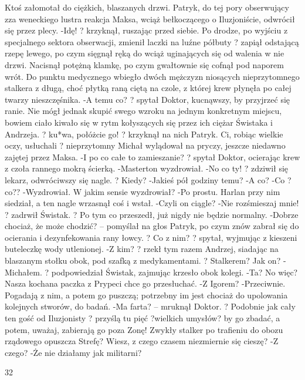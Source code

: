 \documentclass[../MAIN.tex]{subfiles}
\begin{document}
Ktoś załomotał do ciężkich, blaszanych drzwi. Patryk, do tej pory obserwujący zza weneckiego lustra reakcja Maksa, wciąż bełkoczącego o Iluzjoniście, odwrócił się przez plecy.
-Idę! ? krzyknął, ruszając przed siebie. Po drodze, po wyjściu z specjalnego sektora obserwacji, zmienił laczki na luźne półbuty ? zapiął odstającą rzepę lewego, po czym sięgnął ręką do wciąż uginających się od walenia w nie drzwi. Nacisnął potężną klamkę, po czym gwałtownie się cofnął pod naporem wrót.
Do punktu medycznego wbiegło dwóch mężczyzn niosących nieprzytomnego stalkera z długą, choć płytką raną ciętą na czole, z której krew płynęła po całej twarzy nieszczęśnika.
-A temu co? ? spytał Doktor, kucnąwszy, by przyjrzeć się ranie. Nie mógł jednak skupić swego wzroku na jednym konkretnym miejscu, bowiem ciało kiwało się w rytm kołyszących się przez ich ciężar Świstaka i Andrzeja. ? ku*wa, połóżcie go! ? krzyknął na nich Patryk. Ci, robiąc wielkie oczy, usłuchali ? nieprzytomny Michał wylądował na pryczy, jeszcze niedawno zajętej przez Maksa.
-I po co całe to zamieszanie? ? spytał Doktor, ocierając krew z czoła rannego mokrą ścierką.
-Masterton wyzdrowiał.
-No co ty! ? zdziwił się lekarz, odwróciwszy się nagle. ? Kiedy?
-Jakieś pół godziny temu?
-A co?
-Co ?co??
-Wyzdrowiał. W jakim sensie wyzdrowiał?
-Po prostu. Harlan przy nim siedział, a ten nagle wrzasnął coś i wstał.
-Czyli on ciągle?
-Nie rozśmieszaj mnie! ? zadrwił Świstak. ? Po tym co przeszedł, już nigdy nie będzie normalny.
-Dobrze chociaż, że może chodzić? -- pomyślał na głos Patryk, po czym znów zabrał się do ocierania i dezynfekowania rany łowcy. ? Co z nim? ? spytał, wyjmując z kieszeni buteleczkę wody utlenionej.
-Z kim? ? rzekł tym razem Andrzej, siadając na blaszanym stołku obok, pod szafką z medykamentami. ? Stalkerem? Jak on?
-Michałem. ? podpowiedział Świstak, zajmując krzesło obok kolegi.
-Ta? No więc? Nasza kochana paczka z Prypeci chce go przesłuchać.
-Z Igorem?
-Przeciwnie. Pogadają z nim, a potem go puszczą; potrzebny im jest chociaż do upolowania kolejnych stworów, do badań.
-Ma farta? -- mruknął Doktor. ? Podobnie jak cały ten gość od Iluzjonisty ? przyślą tu pięć ?wielkich umysłów? by go zbadać, a potem, uważaj, zabierają go poza Zonę! Zwykły stalker po trafieniu do obozu rządowego opuszcza Strefę? Wiesz, z czego czasem niezmiernie się cieszę?
-Z czego?
-Że nie działamy jak militarni?

32
\end{document}
